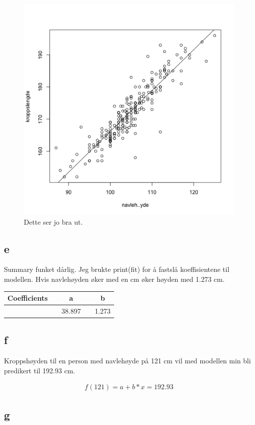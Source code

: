 \begin{figure}[H]
		\centering
		\includegraphics[width=0.7\linewidth]{3D.pdf}
		\caption{Dette ser jo bra ut. }
		\label{fig:3D}
\end{figure}


\subsection*{e}
Summary funket dårlig. Jeg brukte print(fit) for å fastslå koeffisientene til modellen. Hvis navlehøyden øker med en cm øker høyden med 1.273 cm.

\begin{center}
\label{tab:e}
\begin{tabularx}{\textwidth}{c X c X c }
    \hline
    \hline
        Coefficients && a && b\\
    \hline
				   	&& 38.897 && 1.273\\
    \hline
\end{tabularx}
\end{center}

\subsection*{f}
Kroppshøyden til en person med navlehøyde på 121 cm vil med modellen min bli predikert til 192.93 cm. 

\begin{align*}
	f(121)= a + b*x = 192.93
\end{align*}

\pagebreak
\subsection*{g}

